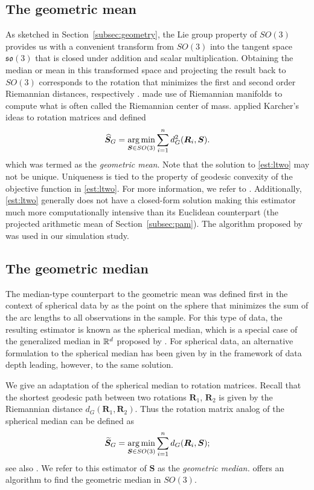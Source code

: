 \subsection{The geometric mean}
\label{section:ltwo}
As sketched in Section~\ref{subsec:geometry}, the Lie group property of $SO(3)$ provides us with a convenient transform from $SO(3)$
into the tangent space $\mathfrak{so}(3)$ that is closed under
addition and scalar multiplication.  Obtaining the median or mean
in this transformed space and projecting the result back to $SO(3)$ corresponds to the rotation that minimizes the first and second order Riemannian
distances, respectively \citep{karcher77, moakher02, fletcher08, fletcher09}.  \citet{karcher77} made use of Riemannian manifolds to compute what is often called the Riemannian
center of mass.  \citet{moakher02} applied Karcher's ideas to
rotation matrices and defined
\begin{equation}\label{est:ltwo}
\widehat{\bm{S}}_{G}=\operatorname*{arg\,min}_{\bm{S}\in
SO(3)}\sum_{i=1}^nd_G^2(\bm{R}_i,\bm{S}).
\end{equation}
which was termed as the \textit{geometric mean}.  Note that the solution to  \eqref{est:ltwo} may not be
unique. Uniqueness is tied to the property of geodesic convexity of the objective function in \eqref{est:ltwo}. For more information, we refer to \citet{moakher02}.  Additionally, \eqref{est:ltwo} generally does not have a closed-form solution making this estimator much more computationally intensive than its Euclidean counterpart (the projected arithmetic mean of Section~\ref{subsec:pam}).  The algorithm proposed by \citet{manton04} was used in our simulation study.

\subsection{The geometric median}
\label{subsec:lone}
The median-type counterpart to the geometric mean was defined first in the context of
spherical data by \citet{fisher85} as the point on the sphere that minimizes the sum of the arc lengths to all
observations in the sample.   For this type of data, the resulting estimator is known as the spherical median,
 which is a special case of the generalized median in ${\mathbb{R}}^d$
proposed by \citet{gower74}.   For spherical data, an alternative formulation to the
spherical median has been given by \citet{liu92} in the framework of
data depth leading, however, to the same solution.

We give an adaptation of the spherical median to rotation matrices. 
Recall that the shortest geodesic path between two rotations ${\bm R_1}$, ${\bm R_2}$ is given by the Riemannian distance $d_G(\bm R_1,\bm R_2)$.  Thus the rotation matrix analog of the \cite{fisher85} spherical
median can be defined as
\begin{equation}\label{est:lone}
\widetilde{\bm{S}}_{G}=\operatorname*{arg\,min}_{\bm{S}\in
SO(3)}\sum_{i=1}^nd_G(\bm{R}_i,\bm{S});
\end{equation}
see also \cite{fletcher08, fletcher09}.  We refer to this estimator of $\bm{S}$ as the \textit{geometric median.}  \citet{hartley11} offers an algorithm to find the geometric median in $SO(3)$.


